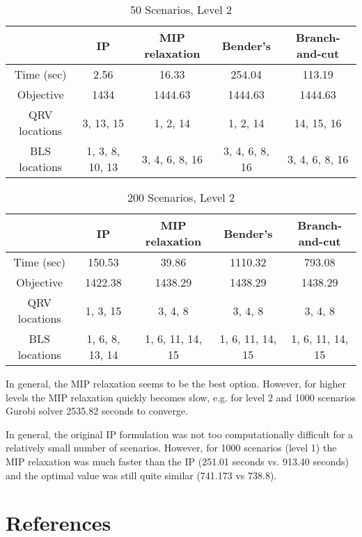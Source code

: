 \documentclass[12pt]{report}
\begin{document}
\begin{table}[h]
    \centering
    \caption{50 Scenarios, Level 2 \label{tbl:50L1}}
    \begin{tabular}{SSSSS} \toprule
        {} & {IP} & {MIP relaxation} & {Bender's} & {Branch-and-cut} \\ \midrule
        {Time (sec)} & 2.56  & 16.33   & 254.04  & 113.19 \\
        {Objective}  & 1434  & 1444.63 & 1444.63 & 1444.63 \\
        {QRV locations}  & 
        {3, 13, 15} &
        {1, 2, 14} & 
        {1, 2, 14} & 
        {14, 15, 16} \\
        {BLS locations}  & 
        {1, 3, 8, 10, 13} & 
        {3, 4, 6, 8, 16} & 
        {3, 4, 6, 8, 16} & 
        {3, 4, 6, 8, 16} \\
     \bottomrule
    \end{tabular}
\end{table}

\begin{table}[h]
    \centering
    \caption{200 Scenarios, Level 2 \label{tbl:50L1}}
    \begin{tabular}{SSSSS} \toprule
        {} & {IP} & {MIP relaxation} & {Bender's} & {Branch-and-cut} \\ \midrule
        {Time (sec)} & 150.53   & 39.86   & 1110.32   & 793.08 \\
        {Objective}  & 1422.38  & 1438.29 & 1438.29   & 1438.29 \\
        {QRV locations}  & 
        {1, 3, 15} &
        {3, 4, 8} & 
        {3, 4, 8} & 
        {3, 4, 8} \\
        {BLS locations}  & 
        {1, 6, 8, 13, 14} & 
        {1, 6, 11, 14, 15} & 
        {1, 6, 11, 14, 15} & 
        {1, 6, 11, 14, 15} \\
     \bottomrule
    \end{tabular}
\end{table}

In general, the MIP relaxation seems to be the best option.
However, for higher levels the MIP relaxation quickly becomes slow, e.g. for level 2 and 1000 scenarios Gurobi solver 2535.82 seconds to converge.

In general, the original IP formulation was not too computationally difficult for a relatively small number of scenarios.
However, for 1000 scenarios (level 1) the MIP relaxation was much faster than the IP (251.01 seconds vs. 913.40 seconds) and the optimal value was still quite similar (741.173 vs 738.8).

\newpage
\section*{References}

\printbibliography[heading=none]
\end{document}
